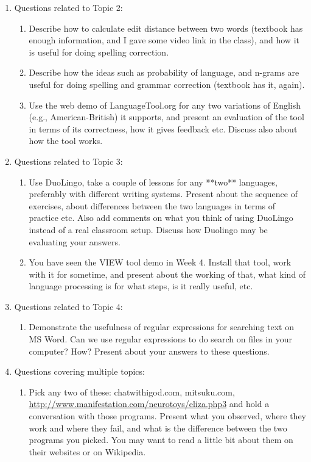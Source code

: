 \documentclass[11pt,a4paper]{article}
\begin{document}
\begin{enumerate}
\item Questions related to Topic 2:
\begin{enumerate}
\item Describe how to calculate edit distance between two words (textbook has enough information, and I gave some video link in the class), and how it is useful for doing spelling correction.
\item Describe how the ideas such as probability of language, and n-grams are useful for doing spelling and grammar correction (textbook has it, again).
\item Use the web demo of LanguageTool.org for any two variations of English (e.g., American-British) it supports, and present an evaluation of the tool in terms of its correctness, how it gives feedback etc. Discuss also about how the tool works.
\end{enumerate}
\item Questions related to Topic 3:
\begin{enumerate}
\item Use DuoLingo, take a couple of lessons for any **two** languages, preferably with different writing systems. Present about the sequence of exercises, about differences between the two languages in terms of practice etc. Also add comments on what you think of using DuoLingo instead of a real classroom setup. Discuss how Duolingo may be evaluating your answers. 
\item You have seen the VIEW tool demo in Week 4. Install that tool, work with it for sometime, and present about the working of that, what kind of language processing is for what steps, is it really useful, etc.
\end{enumerate}
\item Questions related to Topic 4:
\begin{enumerate}
\item Demonstrate the usefulness of regular expressions for searching text on MS Word. Can we use regular expressions to do search on files in your computer? How? Present about your answers to these questions. 
\end{enumerate}
\item Questions covering multiple topics:
\begin{enumerate}
\item Pick any two of these: chatwithigod.com, mitsuku.com, \url{http://www.manifestation.com/neurotoys/eliza.php3} and hold a conversation with those programs. Present what you observed, where they work and where they fail, and what is the difference between the two programs you picked. You may want to read a little bit about them on their websites or on Wikipedia.


\end{enumerate}
\end{enumerate}
\end{document}
